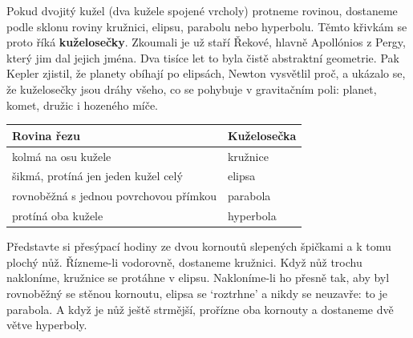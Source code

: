 \label{kap:kuzelosecky}

Pokud dvojitý kužel (dva kužele spojené vrcholy) protneme rovinou, dostaneme podle sklonu roviny kružnici, elipsu, parabolu nebo hyperbolu. Těmto křivkám se proto říká \textbf{kuželosečky}. Zkoumali je už staří Řekové, hlavně Apollónios z Pergy, který jim dal jejich jména. Dva tisíce let to byla čistě abstraktní geometrie. Pak Kepler zjistil, že planety obíhají po elipsách, Newton vysvětlil proč, a ukázalo se, že kuželosečky jsou dráhy všeho, co se pohybuje v gravitačním poli: planet, komet, družic i hozeného míče.

\begin{center}
  \renewcommand{\arraystretch}{1.3}
  \begin{tabular}{|l|l|}
    \hline
    Rovina řezu & Kuželosečka \\
    \hline
    kolmá na osu kužele & kružnice \\
    šikmá, protíná jen jeden kužel celý & elipsa \\
    rovnoběžná s jednou povrchovou přímkou & parabola \\
    protíná oba kužele & hyperbola \\
    \hline
  \end{tabular}
\end{center}

Představte si přesýpací hodiny ze dvou kornoutů slepených špičkami a k tomu plochý nůž. Řízneme-li vodorovně, dostaneme kružnici. Když nůž trochu nakloníme, kružnice se protáhne v elipsu. Nakloníme-li ho přesně tak, aby byl rovnoběžný se stěnou kornoutu, elipsa se `roztrhne' a nikdy se neuzavře: to je parabola. A když je nůž ještě strmější, prořízne oba kornouty a dostaneme dvě větve hyperboly.

